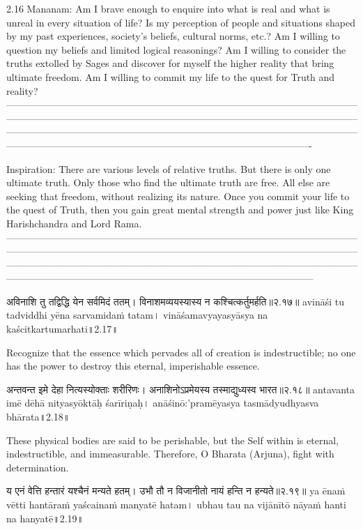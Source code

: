 2.16 Mananam:
Am I brave enough to enquire into what is real and what is unreal in every situation of life? Is my perception of people and situations shaped by my past experiences, society’s beliefs, cultural norms, etc.? Am I willing to question my beliefs and limited logical reasonings? Am I willing to consider the truths extolled by Sages and discover for myself the higher reality that bring ultimate freedom. Am I willing to commit my life to the quest for Truth and reality?
—-------------------------------------------------------------------------------------------------------------------------------------------------------------------------------------------------------------------------------------------------------------------------------------------------------------------------------------------------------------------------------------------------------------------------------
 
Inspiration:
There are various levels of relative truths. But there is only one ultimate truth. Only those who find the ultimate truth are free. All else are seeking that freedom, without realizing its nature. Once you commit your life to the quest of Truth, then you gain great mental strength and power just like King Harishchandra and Lord Rama.
—--------------------------------------------------------------------------------------------------------------------------------------------------------------------------------------------------------------------------------------------------------------------------------------------------------------------------------------------------------------------------------------------------------------------------------


अविनाशि तु तद्विद्धि येन सर्वमिदं ततम्।
 विनाशमव्ययस्यास्य न कश्चित्कर्तुमर्हति॥२.१७॥
avināśi tu tadviddhi yēna sarvamidaṁ tatam।
vināśamavyayasyāsya na kaścitkartumarhati॥2.17॥

Recognize that the essence which pervades all of creation is indestructible; no one has the power to destroy this eternal, imperishable essence.

अन्तवन्त इमे देहा नित्यस्योक्ताः शरीरिणः।
 अनाशिनोऽप्रमेयस्य तस्माद्युध्यस्व भारत॥२.१८॥
antavanta imē dēhā nityasyōktāḥ śarīriṇaḥ।
anāśinō:'pramēyasya tasmādyudhyasva bhārata॥2.18॥

These physical bodies are said to be perishable, but the Self within is eternal, indestructible, and immeasurable. Therefore, O Bharata (Arjuna), fight with determination.

य एनं वेत्ति हन्तारं यश्चैनं मन्यते हतम्।
 उभौ तौ न विजानीतो नायं हन्ति न हन्यते॥२.१९॥
ya ēnaṁ vētti hantāraṁ yaścainaṁ manyatē hatam।
ubhau tau na vijānītō nāyaṁ hanti na hanyatē॥2.19॥

